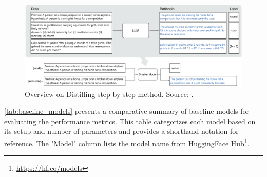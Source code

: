 \begin{figure}[hbt]
    \centering
    \includegraphics[width=0.99\linewidth]{figs/stepbystep.png}
    \caption[Overview on Distilling step-by-step method.]{Overview on Distilling step-by-step method. Source: \cite{stepbystep}.}
    \label{fig:stepbystep}
\end{figure}

\autoref{tab:baseline_models} presents a comparative summary of baseline models for evaluating the performance metrics. This table categorizes each model based on its setup and number of parameters and provides a shorthand notation for reference. The "Model" column lists the model name from HuggingFace Hub\footnote{\url{https://hf.co/models}}.

\begin{table}[h]
    \centering
    \caption{Baseline Models}
    \label{tab:baseline_models}
\end{table}

